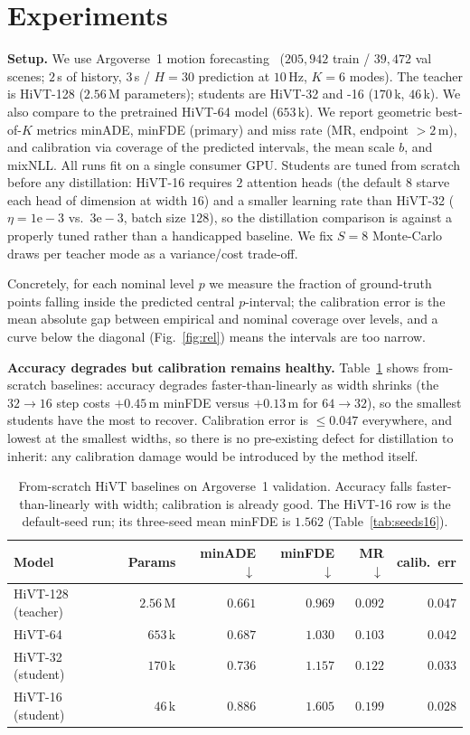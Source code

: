 \documentclass[conference]{IEEEtran}
\begin{document}
\section{Experiments}
\label{sec:exp}
\textbf{Setup.} We use Argoverse~1 motion forecasting~\cite{argoverse} ($205{,}942$ train /
$39{,}472$ val scenes; $2$\,s of history, $3$\,s / $H{=}30$ prediction at $10$\,Hz,
$K{=}6$ modes). The teacher is HiVT-128 ($2.56$\,M parameters); students are HiVT-32
and -16 ($170$\,k, $46$\,k). We also compare to the pretrained HiVT-64 model ($653$\,k).
We report geometric best-of-$K$ metrics minADE, minFDE (primary) and miss rate
(MR, endpoint $>2$\,m), and calibration via coverage of the predicted
intervals, the mean scale $b$, and mixNLL. All runs fit on a single consumer GPU. Students are
tuned from scratch before any distillation: HiVT-16 requires $2$ attention heads
(the default $8$ starve each head of dimension at width $16$) and a smaller learning
rate than HiVT-32 ($\eta{=}1\mathrm{e}{-}3$ vs.\ $3\mathrm{e}{-}3$, batch size $128$), 
so the distillation comparison is against a properly tuned rather
than a handicapped baseline. We fix $S{=}8$ Monte-Carlo draws per teacher mode as a
variance/cost trade-off.

Concretely, for each nominal level $p$ we measure the fraction of ground-truth points
falling inside the predicted central $p$-interval; the calibration error is the mean
absolute gap between empirical and nominal coverage over levels, and a curve below the
diagonal (Fig.~\ref{fig:rel}) means the intervals are too narrow.

\textbf{Accuracy degrades but calibration remains healthy.}
Table~\ref{tab:baseline} shows from-scratch baselines: accuracy degrades
faster-than-linearly as width shrinks (the $32\to16$ step costs $+0.45$\,m minFDE
versus $+0.13$\,m for $64\to32$), so the smallest students have the most to recover.
Calibration error is $\le 0.047$ everywhere, and lowest at the smallest widths, so
there is no pre-existing defect for distillation to inherit: any calibration damage
would be introduced by the method itself.

\begin{table}[t]
  \centering
  \caption{From-scratch HiVT baselines on Argoverse~1 validation. Accuracy falls
  faster-than-linearly with width; calibration is already good. The HiVT-16 row is the
  default-seed run; its three-seed mean minFDE is $1.562$ (Table~\ref{tab:seeds16}).}
  \label{tab:baseline}
  \begin{tabular}{lrrrrr}
    \toprule
    Model & Params & minADE$\downarrow$ & minFDE$\downarrow$ & MR$\downarrow$ & calib.\ err \\
    \midrule
    HiVT-128 (teacher) & $2.56$\,M & $0.661$ & $0.969$ & $0.092$ & $0.047$ \\
    HiVT-64            & $653$\,k  & $0.687$ & $1.030$ & $0.103$ & $0.042$ \\
    HiVT-32 (student)  & $170$\,k  & $0.736$ & $1.157$ & $0.122$ & $0.033$ \\
    HiVT-16 (student)  & $46$\,k   & $0.886$ & $1.605$ & $0.199$ & $0.028$ \\
    \bottomrule
  \end{tabular}
\end{table}
\end{document}
